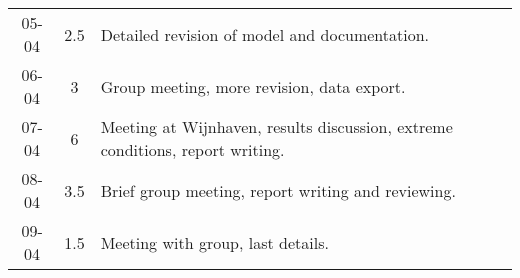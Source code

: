 \begin{longtable}[c]{c|c|m{35em}}
05-04   &   2.5     &   Detailed revision of model and documentation.                                \\
06-04   &   3       &   Group meeting, more revision, data export.                                   \\
07-04   &   6       &   Meeting at Wijnhaven, results discussion, extreme conditions, report writing.\\
08-04   &   3.5     &   Brief group meeting, report writing and reviewing.                           \\
09-04   &   1.5     &   Meeting with group, last details. \\



\end{longtable}

